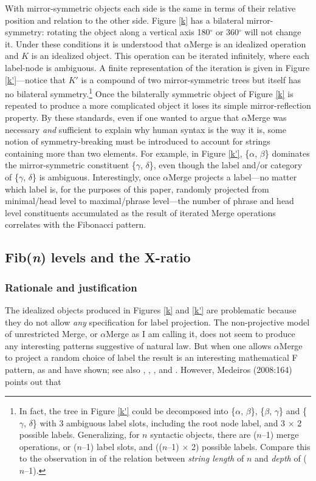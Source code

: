 \documentclass[11pt,twoside]{article}
\theoremstyle{plain}
\numberwithin{equation}{section}
\theoremstyle{definition}
\newtheorem{phrase string}{Phrase String}
\begin{document}
With mirror-symmetric objects each side is the same in terms of their relative position and relation to the other side. Figure \ref{k} has a bilateral mirror-symmetry: rotating the object along a vertical axis 180$^{\circ}$ or 360$^{\circ}$ will not change it. Under these conditions it is understood that $\alpha$Merge is an idealized operation and $K$ is an idealized object. This operation can be iterated infinitely, where each label-node is ambiguous. A finite representation of the iteration is given in Figure \ref{k'}---notice that $K'$ is a compound of two mirror-symmetric trees but itself has no bilateral symmetry.\footnote{In fact, the tree in Figure \ref{k'} could be decomposed into \{$\alpha$, $\beta$\}, \{$\beta$, $\gamma$\} and \{$\gamma$, $\delta$\} with 3 ambiguous label slots, including the root node label, and 3 $\times$ 2 possible labels. Generalizing, for $n$ syntactic objects, there are ($n$--1) merge operations, or ($n$--1) label slots, and (($n$--1) $\times$ 2) possible labels. Compare this to the observation in \cite{medeiros:2008} of the relation between \textsl{string length} of $n$ and \textsl{depth} of ($n$--1).} 
Once the bilaterally symmetric object of Figure \ref{k} is repeated to produce a more complicated object it loses its simple mirror-reflection property. By these standards, even if one wanted to argue that $\alpha$Merge was necessary \textsl{and} sufficient to explain why human syntax is the way it is, some notion of symmetry-breaking must be introduced to account for strings containing more than two elements. For example, in Figure \ref{k'}, \{$\alpha$, $\beta$\} dominates the mirror-symmetric constituent \{$\gamma$, $\delta$\}, even though the label and/or category of \{$\gamma$, $\delta$\} is ambiguous. Interestingly, once $\alpha$Merge projects a label---no matter which label is, for the purposes of this paper, randomly projected from minimal/head level to maximal/phrase level---the number of phrase and head level constituents accumulated as the result of iterated Merge operations correlates with the Fibonacci pattern.  


\subsection{Fib(\emph{n}) levels and the X-ratio}\label{x}
\subsubsection{Rationale and justification}
The idealized objects produced in Figures \ref{k} and \ref{k'} are problematic because they do not allow \textsl{any} specification for label projection. The non-projective model of unrestricted Merge, or $\alpha$Merge as I am calling it, does not seem to produce any interesting patterns suggestive of natural law. But when one allows $\alpha$Merge to project a random choice of label the result is an interesting mathematical F pattern, as \cite{medeiros:2008} and \cite{soschen:2008} have shown; see also \cite{bcm:2006}, \cite{cm:2005}, \cite{idsardi:2008}, and \cite{ppuriagereka:2008}. However, Medeiros (2008:164) points out that 
\end{document}
